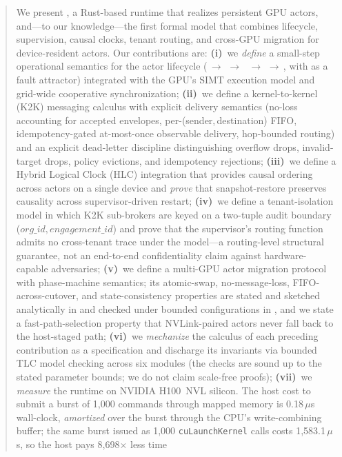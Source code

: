 \begin{abstract}
We present \system{}, a Rust-based runtime that realizes persistent
GPU actors, and---to our knowledge---the first formal model that
combines lifecycle, supervision, causal clocks, tenant routing, and
cross-GPU migration for device-resident actors.  Our contributions
are:
\textbf{(i)}~we \emph{define} a small-step operational semantics for
the actor lifecycle (\Dormant{}\,\(\to\)\,\Initializing{}\,\(\to\)\,%
\Active{}\,\(\to\)\,\Draining{}\,\(\to\)\,\Terminated{}, with
\Failed{} as a fault attractor) integrated with the GPU's SIMT
execution model and grid-wide cooperative synchronization;
\textbf{(ii)}~we define a kernel-to-kernel (K2K) messaging calculus
with explicit delivery semantics (no-loss accounting for accepted
envelopes, per-(sender,\,destination) FIFO, idempotency-gated
at-most-once observable delivery, hop-bounded routing) and an
explicit dead-letter discipline distinguishing overflow drops,
invalid-target drops, policy evictions, and idempotency rejections;
\textbf{(iii)}~we define a Hybrid Logical Clock (HLC) integration
that provides causal ordering across actors on a single device and
\emph{prove} that snapshot-restore preserves causality across
supervisor-driven restart;
\textbf{(iv)}~we define a tenant-isolation model in which K2K
sub-brokers are keyed on a two-tuple audit boundary
(\(\mathit{org\_id}, \mathit{engagement\_id}\)) and prove that the
supervisor's routing function admits no cross-tenant trace under
the model—a routing-level structural guarantee, not an end-to-end
confidentiality claim against hardware-capable adversaries;
\textbf{(v)}~we define a multi-GPU actor migration protocol with
phase-machine semantics; its atomic-swap, no-message-loss,
FIFO-across-cutover, and state-consistency properties are stated
and sketched analytically in  and checked
under bounded configurations in \TLA{}, and we state a
fast-path-selection property that NVLink-paired actors never fall
back to the host-staged path;
\textbf{(vi)}~we \emph{mechanize} the calculus of each preceding
contribution as a \TLA{} specification and discharge its invariants
via bounded TLC model checking across six modules (the checks are
sound up to the stated parameter bounds; we do not claim scale-free
proofs);
\textbf{(vii)}~we \emph{measure} the runtime on NVIDIA H100~NVL
silicon.  The host cost to submit a burst of 1{,}000 commands
through mapped memory is 0.18\,\(\mu\)s wall-clock, \emph{amortized}
over the burst through the CPU's write-combining buffer; the same
burst issued as 1{,}000 \texttt{cuLaunchKernel} calls costs
1{,}583.1\,\(\mu\)s, so the host pays 8{,}698\(\times\) less time

\end{abstract}

